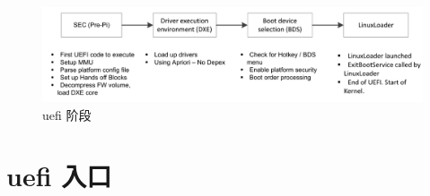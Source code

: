 \begin{figure}[htbp]
\begin{center}
\includegraphics[width=15cm]{img/uefistage}
\caption{uefi 阶段}
\label{xblstage}
\end{center}
\vspace{-0.5em}
\end{figure}

\section{uefi 入口}

